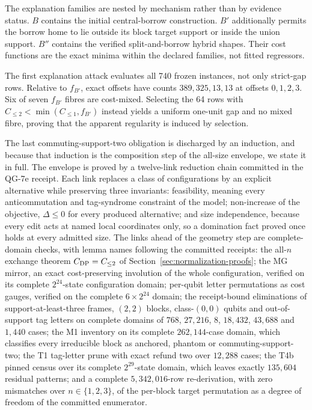 \documentclass[a4paper,onecolumn,11pt,unpublished,noarxiv]{quantumarticle}
\begin{document}
The explanation families are nested by mechanism rather than by evidence status.  $B$ contains the initial central-borrow construction.  $B'$ additionally permits the borrow home to lie outside its block target support or inside the union support.  $B''$ contains the verified split-and-borrow hybrid shapes.  Their cost functions are the exact minima within the declared families, not fitted regressors.

The first explanation attack evaluates all 740 frozen instances, not only strict-gap rows.  Relative to $f_{B'}$, exact offsets have counts $389,325,13,13$ at offsets $0,1,2,3$.  Six of seven $f_{B'}$ fibres are cost-mixed.  Selecting the 64 rows with $C_{\le2}<\min(C_{\le1},f_{B'})$ instead yields a uniform one-unit gap and no mixed fibre, proving that the apparent regularity is induced by selection.

The last commuting-support-two obligation is discharged by an induction, and because that induction is the composition step of the all-size envelope, we state it in full.  The envelope is proved by a twelve-link reduction chain committed in the QG-7e receipt.  Each link replaces a class of configurations by an explicit alternative while preserving three invariants: feasibility, meaning every anticommutation and tag-syndrome constraint of the model; non-increase of the objective, $\Delta\le0$ for every produced alternative; and size independence, because every edit acts at named local coordinates only, so a domination fact proved once holds at every admitted size.  The links ahead of the geometry step are complete-domain checks, with lemma names following the committed receipts: the all-$n$ exchange theorem $C_{\rm DP}=C_{\le2}$ of Section~\ref{sec:normalization-proofs}; the MG mirror, an exact cost-preserving involution of the whole configuration, verified on its complete $2^{24}$-state configuration domain; per-qubit letter permutations as cost gauges, verified on the complete $6\times2^{24}$ domain; the receipt-bound eliminations of support-at-least-three frames, $(2,2)$ blocks, class-$(0,0)$ qubits and out-of-support tag letters on complete domains of $768$, $27{,}216$, $8$, $18{,}432$, $43{,}688$ and $1{,}440$ cases; the M1 inventory on its complete $262{,}144$-case domain, which classifies every irreducible block as anchored, phantom or commuting-support-two; the T1 tag-letter prune with exact refund two over $12{,}288$ cases; the T4b pinned census over its complete $2^{29}$-state domain, which leaves exactly $135{,}604$ residual patterns; and a complete $5{,}342{,}016$-row re-derivation, with zero mismatches over $n\in\{1,2,3\}$, of the per-block target permutation as a degree of freedom of the committed enumerator.
\end{document}
